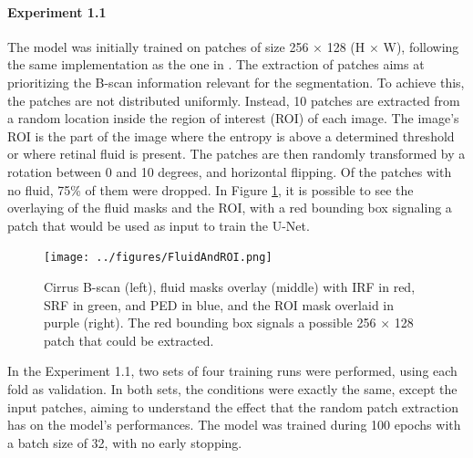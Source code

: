 \paragraph{Experiment 1.1}
The model was initially trained on patches of size 256 $\times$ 128 (H $\times$ W), following the same implementation as the one in \textcite{Tennakoon2018}. The extraction of patches aims at prioritizing the B-scan information relevant for the segmentation. To achieve this, the patches are not distributed uniformly. Instead, 10 patches are extracted from a random location inside the region of interest (ROI) of each image. The image's ROI is the part of the image where the entropy is above a determined threshold or where retinal fluid is present. The patches are then randomly transformed by a rotation between 0 and 10 degrees, and horizontal flipping. Of the patches with no fluid, 75\% of them were dropped. In Figure \ref{fig:FluidAndROI}, it is possible to see the overlaying of the fluid masks and the ROI, with a red bounding box signaling a patch that would be used as input to train the U-Net.

\begin{figure}[!ht]
	\centering
	\texttt{[image: ../figures/FluidAndROI.png]}
	\caption{Cirrus B-scan (left), fluid masks overlay (middle) with IRF in red, SRF in green, and PED in blue, and the ROI mask overlaid in purple (right). The red bounding box signals a possible 256 $\times$ 128 patch that could be extracted.}
	\label{fig:FluidAndROI}
\end{figure}

\par
In the Experiment 1.1, two sets of four training runs were performed, using each fold as validation. In both sets, the conditions were exactly the same, except the input patches, aiming to understand the effect that the random patch extraction has on the model's performances. The model was trained during 100 epochs with a batch size of 32, with no early stopping.

